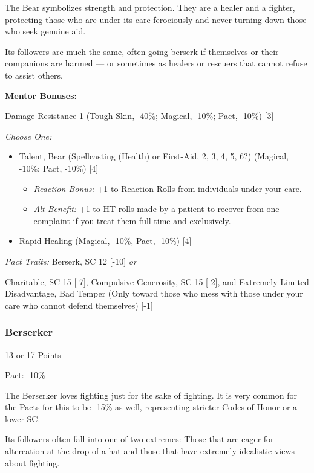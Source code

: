 \begin{multicols}{3}
	The Bear symbolizes strength and protection. They are a healer and a fighter, protecting those who are under its care ferociously and never turning down those who seek genuine aid. 
	
	Its followers are much the same, often going berserk if themselves or their companions are harmed — or sometimes as healers or rescuers that cannot refuse to assist others.
	
	\textbf{Mentor Bonuses:} 
	
	Damage Resistance 1 (Tough Skin, -40\%; Magical, -10\%; Pact, -10\%) [3]
	
	\textit{Choose One:}
	\begin{itemize}
		\itemsep 0pt
		\item Talent, Bear (Spellcasting (Health) or First-Aid, 2, 3, 4, 5, 6?) (Magical, -10\%; Pact, -10\%) [4] %
		\begin{itemize}
			\itemsep 0pt
			\item \textit{Reaction Bonus:} +1 to Reaction Rolls from individuals under your care.
			\item \textit{Alt Benefit:} +1 to HT rolls made by a patient to recover from one complaint if you treat them full-time and exclusively.
		\end{itemize}
		\item Rapid Healing (Magical, -10\%, Pact, -10\%) [4]
	\end{itemize}
	
	\textit{Pact Traits:} Berserk, SC 12 [-10] \textit{or} 
	
	Charitable, SC 15 [-7], Compulsive Generosity, SC 15 [-2], and Extremely Limited Disadvantage, Bad Temper (Only toward those who mess with those under your care who cannot defend themselves) [-1]
	
	\subsubsection{Berserker}
	\begin{flushright}
		13 or 17 Points
	\end{flushright}
	Pact: -10\%
	
	The Berserker loves fighting just for the sake of fighting. It is very common for the Pacts for this to be -15\% as well, representing stricter Codes of Honor or a lower SC.
	
	Its followers often fall into one of two extremes: Those that are eager for altercation at the drop of a hat and those that have extremely idealistic views about fighting.
	

\end{multicols}

